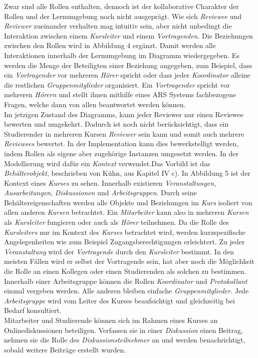 \documentclass[conference]{IEEEtran}
\begin{document}
Zwar sind alle Rollen enthalten, dennoch ist der kollaborative Charakter der Rollen und der Lernumgebung noch nicht ausgeprägt. Wie sich \textit{Reviewee} und \textit{Reviewer} zueinander verhalten mag intuitiv sein, aber nicht unbedingt die Interaktion zwischen einem \textit{Kursleiter} und einem \textit{Vortragenden}. Die Beziehungen zwischen den Rollen wird in Abbildung 4 ergänzt. Damit werden alle Interaktionen innerhalb der Lernumgebung im Diagramm wiedergegeben. Es werden die Menge der Beteiligten einer Beziehung angegeben, zum Beispiel, dass ein \textit{Vortragender} vor mehreren \textit{Hörer} spricht oder dass jeder \textit{Koordinator} alleine die restlichen \textit{Gruppenmitglieder} organisiert. Ein \textit{Vortragender} spricht vor mehreren \textit{Hörern} und stellt ihnen mithilfe eines ARS Systems fachbezogene Fragen, welche dann von allen beantwortet werden können.\\

Im jetzigen Zustand des Diagramms, kann jeder Reviewer nur einen Reviewee bewerten und umgekehrt. Dadurch ist noch nicht berücksichtigt, dass ein Studierender in mehreren Kursen \textit{Reviewer} sein kann und somit auch mehrere \textit{Reviewees} bewertet. In der Implementation kann dies bewerkstelligt werden, indem Rollen als eigene aber zugehörige Instanzen umgesetzt werden. In der Modellierung wird dafür ein \textit{Kontext} verwendet.Das Vorbild ist das \textit{Behälterobjekt}, beschrieben von Kühn, aus Kapitel IV c). In Abbildung 5 ist der Kontext eines \textit{Kurses} zu sehen.  Innerhalb existieren \textit{Veranstaltungen}, \textit{Ausarbeitungen}, \textit{Diskussionen} und \textit{Arbeitsgruppen}. Durch seine Behältereigenschaften werden alle Objekte und Beziehungen im \textit{Kurs} isoliert von allen anderen \textit{Kursen} betrachtet. Ein \textit{Mitarbeiter} kann also in mehreren \textit{Kursen} als \textit{Kursleiter} fungieren oder auch als \textit{Hörer} teilnehmen. Da die Rolle des \textit{Kursleiters} nur im Kontext des \textit{Kurses} betrachtet wird, werden kurzspezifische Angelegenheiten wie zum Beispiel Zugangsberechtigungen erleichtert. Zu jeder \textit{Veranstaltung} wird der \textit{Vortragende} durch den \textit{Kursleiter} bestimmt. In den meisten Fällen wird er selbst der Vortragende sein, hat aber noch die Möglichkeit die Rolle an einen Kollegen oder einen Studierenden als solchen zu bestimmen. Innerhalb einer Arbeitsgruppe können die Rollen \textit{Koordinator} und \textit{Protokollant} einmal vergeben werden. Alle anderen bleiben einfache \textit{Gruppenmitglieder}. Jede \textit{Arbeitsgruppe} wird vom Leiter des Kurses beaufsichtigt und gleichzeitig bei Bedarf konsultiert.\\ Mitarbeiter und Studierende können sich im Rahmen eines Kurses an Onlinediskussionen beteiligen. Verfassen sie in einer \textit{Diskussion} einen Beitrag, nehmen sie die Rolle des \textit{Diskussionsteilnehmer} an und werden benachrichtigt, sobald weitere Beiträge erstellt wurden. \\
\end{document}

